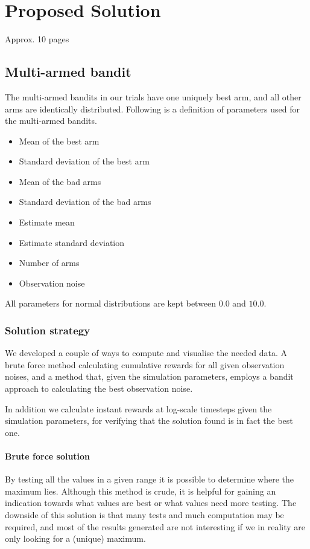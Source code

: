 \chapter{Proposed Solution}
\label{ch:solution}
Approx. 10 pages

\section{Multi-armed bandit}

The multi-armed bandits in our trials have one uniquely best arm, and all other arms are identically distributed.
Following is a definition of parameters used for the multi-armed bandits.
\begin{itemize}
    \item Mean of the best arm
    \item Standard deviation of the best arm
    \item Mean of the bad arms
    \item Standard deviation of the bad arms
    \item Estimate mean
    \item Estimate standard deviation
    \item Number of arms
    \item Observation noise
\end{itemize}
All parameters for normal distributions are kept between $0.0$ and $10.0$.

\subsection{Solution strategy}

We developed a couple of ways to compute and visualise the needed data.
A brute force method calculating cumulative rewards for all given observation noises, and a method that, given the simulation parameters, employs a bandit approach to calculating the best observation noise.

In addition we calculate instant rewards at log-scale timesteps given the simulation parameters, for verifying that the solution found is in fact the best one.

\subsubsection{Brute force solution}

By testing all the values in a given range it is possible to determine where the maximum lies.
Although this method is crude, it is helpful for gaining an indication towards what values are best or what values need more testing.
The downside of this solution is that many tests and much computation may be required, and most of the results generated are not interesting if we in reality are only looking for a (unique) maximum. 

